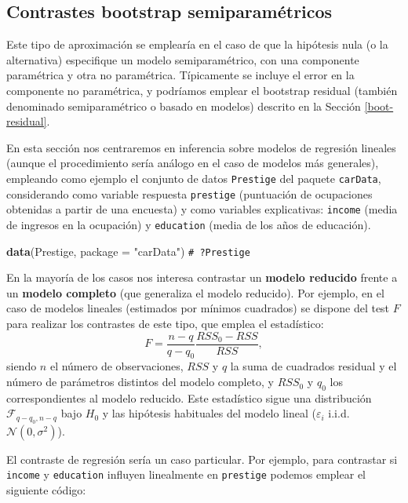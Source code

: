 \documentclass[
  spanish,
  10pt,
]{book}
\newenvironment{Shaded}{\begin{snugshade}}{\end{snugshade}}
\newcommand{\AttributeTok}[1]{\textcolor[rgb]{0.13,0.29,0.53}{#1}}
\newcommand{\CommentTok}[1]{\textcolor[rgb]{0.56,0.35,0.01}{\textit{#1}}}
\newcommand{\FunctionTok}[1]{\textcolor[rgb]{0.13,0.29,0.53}{\textbf{#1}}}
\newcommand{\NormalTok}[1]{#1}
\newcommand{\StringTok}[1]{\textcolor[rgb]{0.31,0.60,0.02}{#1}}
\theoremstyle{break}
\theoremstyle{nonumberplain}
\renewcommand{\CommentTok}[1]{\textcolor[rgb]{0.41,0.41,0.41}{\texttt{#1}}}
\begin{document}
\subsection{Contrastes bootstrap semiparamétricos}\label{contrastes-semiparametricos}

Este tipo de aproximación se emplearía en el caso de que la hipótesis nula
(o la alternativa) especifique un modelo semiparamétrico,
con una componente paramétrica y otra no paramétrica.
Típicamente se incluye el error en la componente no paramétrica, y podríamos emplear
el bootstrap residual (también denominado semiparamétrico o basado en modelos)
descrito en la Sección \ref{boot-residual}.

En esta sección nos centraremos en inferencia sobre modelos de regresión lineales (aunque el procedimiento sería análogo en el caso de modelos más generales), empleando como ejemplo el conjunto de datos \texttt{Prestige} del paquete \texttt{carData}, considerando como variable respuesta \texttt{prestige} (puntuación de ocupaciones obtenidas a partir de una encuesta) y como variables explicativas: \texttt{income} (media de ingresos en la ocupación) y \texttt{education} (media de los años de educación).

\begin{Shaded}
\begin{Highlighting}[]
\FunctionTok{data}\NormalTok{(Prestige, }\AttributeTok{package =} \StringTok{"carData"}\NormalTok{)}
\CommentTok{\# ?Prestige}
\end{Highlighting}
\end{Shaded}

En la mayoría de los casos nos interesa contrastar un \textbf{modelo reducido}
frente a un \textbf{modelo completo} (que generaliza el modelo reducido).
Por ejemplo, en el caso de modelos lineales (estimados por mínimos cuadrados)
se dispone del test \(F\) para realizar los contrastes de este tipo,
que emplea el estadístico:
\[F=\frac{n - q}{q - q_0}\frac{RSS_0 - RSS}{RSS},\]
siendo \(n\) el número de observaciones, \(RSS\) y \(q\) la suma de cuadrados residual y
el número de parámetros distintos del modelo completo,
y \(RSS_0\) y \(q_0\) los correspondientes al modelo reducido.
Este estadístico sigue una distribución \(\mathcal{F}_{q - q_0, n - q}\)
bajo \(H_0\) y las hipótesis habituales del modelo lineal
(\(\varepsilon_i\) i.i.d. \(\mathcal{N}(0, \sigma^2)\)).

El contraste de regresión sería un caso particular. Por ejemplo,
para contrastar si \texttt{income} y \texttt{education} influyen linealmente en \texttt{prestige}
podemos emplear el siguiente código:
\end{document}
